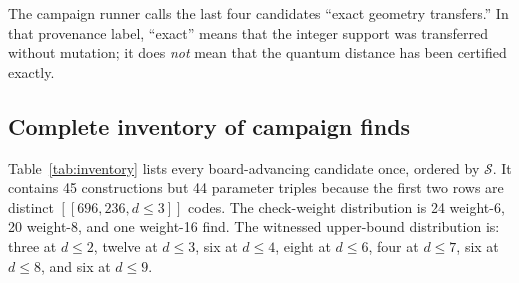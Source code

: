 \documentclass[11pt]{article}
\newcommand{\score}{\mathcal{S}}
\newcommand{\qcode}[3]{\ensuremath{[\![#1,#2,d\!\leq\!#3]\!]}}
\begin{document}
The campaign runner calls the last four candidates ``exact geometry
transfers.''  In that provenance label,
``exact'' means that the integer support was transferred without mutation; it
does \emph{not} mean that the quantum distance has been certified exactly.

\subsection{Complete inventory of campaign finds}

Table~\ref{tab:inventory} lists every board-advancing candidate once, ordered
by $\score$.  It contains 45 constructions but 44 parameter triples because
the first two rows are distinct \qcode{696}{236}{3} codes.  The check-weight
distribution is 24 weight-6, 20 weight-8, and one weight-16 find.  The
witnessed upper-bound distribution is: three at $d\leq2$, twelve at
$d\leq3$, six at $d\leq4$, eight at $d\leq6$, four at $d\leq7$, six at
$d\leq8$, and six at $d\leq9$.
\end{document}

